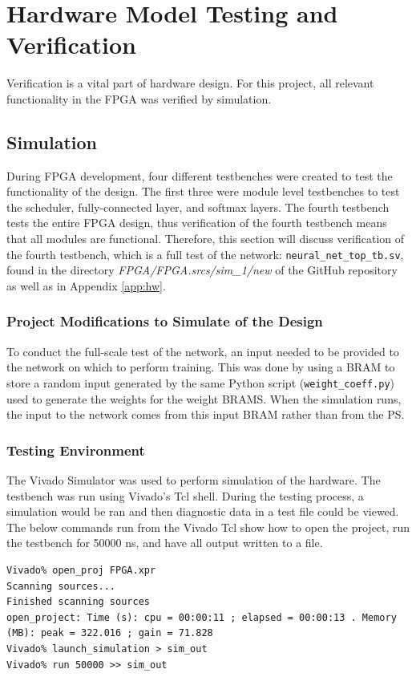 \chapter{Hardware Model Testing and Verification}\label{hw-model-testing}
Verification is a vital part of hardware design. For this project, all relevant functionality in the FPGA was verified by simulation.
\section{Simulation}
During FPGA development, four different testbenches were created to test the functionality of the design. The first three were module level testbenches to test the scheduler, fully-connected layer, and softmax layers. The fourth testbench tests the entire FPGA design, thus verification of the fourth testbench means that all modules are functional. Therefore, this section will discuss verification of the fourth testbench, which is a full test of the network: \texttt{neural\_net\_top\_tb.sv}, found in the directory \textit{FPGA/FPGA.srcs/sim\_1/new} of the GitHub repository as well as in Appendix \ref{app:hw}.

\subsection{Project Modifications to Simulate of the Design}
To conduct the full-scale test of the network, an input needed to be provided to the network on which to perform training. This was done by using a BRAM to store a random input generated by the same Python script (\texttt{weight\_coeff.py}) used to generate the weights for the weight BRAMS. When the simulation runs, the input to the network comes from this input BRAM rather than from the PS.

\subsection{Testing Environment}
The Vivado Simulator was used to perform simulation of the hardware. The testbench was run using Vivado's Tcl shell. During the testing process, a simulation would be ran and then diagnostic data in a test file could be viewed. The below commands run from the Vivado Tcl show how to open the project, run the testbench for 50000 ns, and have all output written to a file.
\begin{lstlisting}
Vivado% open_proj FPGA.xpr
Scanning sources...
Finished scanning sources
open_project: Time (s): cpu = 00:00:11 ; elapsed = 00:00:13 . Memory (MB): peak = 322.016 ; gain = 71.828
Vivado% launch_simulation > sim_out
Vivado% run 50000 >> sim_out
\end{lstlisting}

